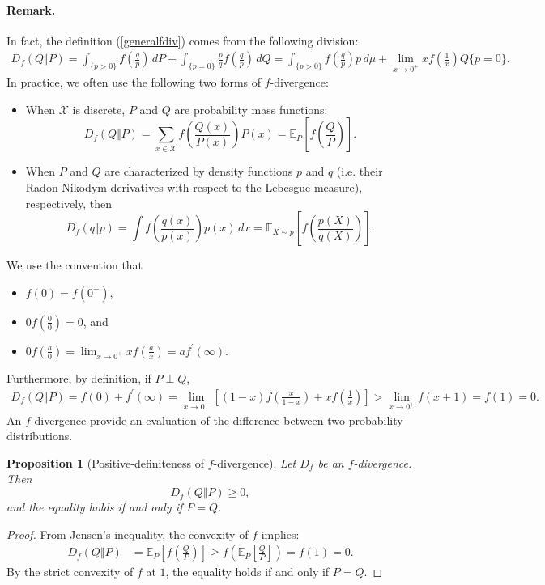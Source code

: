 \documentclass{article}
\numberwithin{equation}{section}
\newcommand{\E}{\mathbb{E}}
\theoremstyle{plain}
\newtheorem{proposition}[theorem]{Proposition}
\theoremstyle{definition}
\begin{document}
\paragraph{Remark.} In fact, the definition (\ref{generalfdiv}) comes from the following division:
\begin{align*}
	D_f(Q\Vert P)=\int_{\{p>0\}}f\left(\frac{q}{p}\right)\,dP+\int_{\{p=0\}}\frac{p}{q}f\left(\frac{q}{p}\right)\,dQ=\int_{\{p>0\}}f\left(\frac{q}{p}\right)p\,d\mu+\lim_{x\to 0^+}xf\left(\frac{1}{x}\right)Q\{p=0\}.
\end{align*}
In practice, we often use the following two forms of $f$-divergence:
\begin{itemize}
\item When $\mathcal{X}$ is discrete, $P$ and $Q$ are probability mass functions:
\begin{equation*}
	D_f(Q\Vert P) = \sum_{x\in\mathcal{X}}f\left(\frac{Q(x)}{P(x)}\right)P(x)=\E_{P}\left[f\left(\frac{Q}{P}\right)\right].
\end{equation*}
	
\item When $P$ and $Q$ are characterized by density functions $p$ and $q$ (i.e. their Radon-Nikodym derivatives with respect to the Lebesgue measure), respectively, then
\begin{equation*}
	D_f(q\Vert p) = \int f\left(\frac{q(x)}{p(x)}\right)p(x)\,dx=\E_{X\sim p}\left[f\left(\frac{p(X)}{q(X)}\right)\right].
\end{equation*}
\end{itemize}
We use the convention that
\begin{itemize}
\item $f(0)=f(0^+)$,
\item $0f\left(\frac{0}{0}\right)=0$, and
\item $0f\left(\frac{a}{0}\right)=\lim_{x\to 0^+}xf\left(\frac{a}{x}\right)=af^\prime(\infty)$.
\end{itemize}
Furthermore, by definition, if $P\perp Q$,
\begin{align*}
	D_f(Q\Vert P)=f(0)+f^\prime(\infty)=\lim_{x\to 0^+}\left[(1-x)f\left(\frac{x}{1-x}\right)+xf\left(\frac{1}{x}\right)\right]>\lim_{x\to 0^+}f\left(x+1\right)=f(1)=0.
\end{align*}
An $f$-divergence provide an evaluation of the difference between two probability distributions.

\begin{proposition}[Positive-definiteness of $f$-divergence]
Let $D_f$ be an $f$-divergence. Then $$D_f(Q\Vert P) \geq 0,$$ and the equality holds if and only if $P=Q$.
\end{proposition}
\begin{proof}
From Jensen's inequality, the convexity of $f$ implies:
\begin{align*}
	D_f(Q\Vert P) &= \mathbb{E}_P\left[f\left(\frac{Q}{P}\right)\right] \geq f\left(\mathbb{E}_P\left[\frac{Q}{P}\right]\right) = f(1) = 0.
\end{align*}
By the strict convexity of $f$ at $1$, the equality holds if and only if $P=Q.$
\end{proof}
\end{document}
